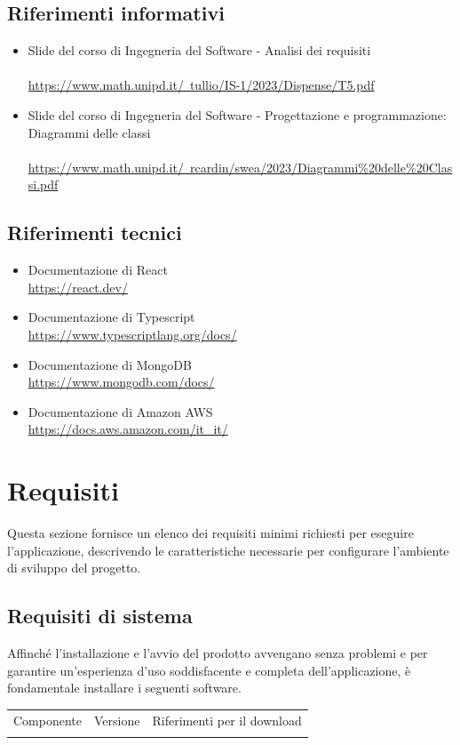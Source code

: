 \documentclass{article}
\begin{document}
{\subsection{Riferimenti informativi}
\begin{itemize}
    \item Slide del corso di Ingegneria del Software - Analisi dei requisiti \\ \\
    \href{https://www.math.unipd.it/~tullio/IS-1/2023/Dispense/T5.pdf}{https://www.math.unipd.it/~tullio/IS-1/2023/Dispense/T5.pdf}
    \item Slide del corso di Ingegneria del Software - Progettazione e programmazione: Diagrammi delle classi \\ \\
\href{https://www.math.unipd.it/~rcardin/swea/2023/Diagrammi%20delle%20Classi.pdf}{https://www.math.unipd.it/~rcardin/swea/2023/Diagrammi\%20delle\%20Classi.pdf}
\end{itemize}
\subsection{Riferimenti tecnici}
\begin{itemize}
\item Documentazione di React \\ \href{ https://react.dev/}{ https://react.dev/}
\item Documentazione di Typescript \\ \href{https://www.typescriptlang.org/docs/}{https://www.typescriptlang.org/docs/}
\item Documentazione di MongoDB \\ \href{https://www.mongodb.com/docs/}{https://www.mongodb.com/docs/}
\item Documentazione di Amazon AWS \\ \href{https://docs.aws.amazon.com/it_it/}{https://docs.aws.amazon.com/it\_it/}
\end{itemize}

\section{Requisiti}
Questa sezione fornisce un elenco dei requisiti minimi richiesti per eseguire l'applicazione, descrivendo le caratteristiche necessarie per configurare l'ambiente di sviluppo del progetto.
\subsection{Requisiti di sistema}
Affinché l'installazione e l'avvio del prodotto avvengano senza problemi e per garantire un'esperienza d'uso soddisfacente e completa dell'applicazione, è fondamentale installare i seguenti software.
\begin{center}
\begin{tabular}{c|c|c}
\hline
\rowcolor{Blue}
Componente & Versione & Riferimenti per il download \\
\rowcolor{LighterBlue}


\end{tabular}
\end{center}}
\end{document}
